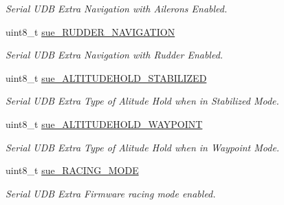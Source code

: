 \begin{DoxyCompactItemize}
\begin{DoxyCompactList}\small\item\em Serial U\+D\+B Extra Navigation with Ailerons Enabled. \end{DoxyCompactList}\item 
uint8\+\_\+t \hyperlink{struct____mavlink__serial__udb__extra__f4__t_ac731fb36106382a31b969d1a2b880478}{sue\+\_\+\+R\+U\+D\+D\+E\+R\+\_\+\+N\+A\+V\+I\+G\+A\+T\+I\+O\+N}
\begin{DoxyCompactList}\small\item\em Serial U\+D\+B Extra Navigation with Rudder Enabled. \end{DoxyCompactList}\item 
uint8\+\_\+t \hyperlink{struct____mavlink__serial__udb__extra__f4__t_a09dd19709d99c5004b0e05a8d5661c26}{sue\+\_\+\+A\+L\+T\+I\+T\+U\+D\+E\+H\+O\+L\+D\+\_\+\+S\+T\+A\+B\+I\+L\+I\+Z\+E\+D}
\begin{DoxyCompactList}\small\item\em Serial U\+D\+B Extra Type of Alitude Hold when in Stabilized Mode. \end{DoxyCompactList}\item 
uint8\+\_\+t \hyperlink{struct____mavlink__serial__udb__extra__f4__t_abd4ba06c222c9511196fa8579f37660c}{sue\+\_\+\+A\+L\+T\+I\+T\+U\+D\+E\+H\+O\+L\+D\+\_\+\+W\+A\+Y\+P\+O\+I\+N\+T}
\begin{DoxyCompactList}\small\item\em Serial U\+D\+B Extra Type of Alitude Hold when in Waypoint Mode. \end{DoxyCompactList}\item 
uint8\+\_\+t \hyperlink{struct____mavlink__serial__udb__extra__f4__t_aaa7a67690f913797d12cc675af6eca37}{sue\+\_\+\+R\+A\+C\+I\+N\+G\+\_\+\+M\+O\+D\+E}
\begin{DoxyCompactList}\small\item\em Serial U\+D\+B Extra Firmware racing mode enabled. \end{DoxyCompactList}\end{DoxyCompactItemize}


